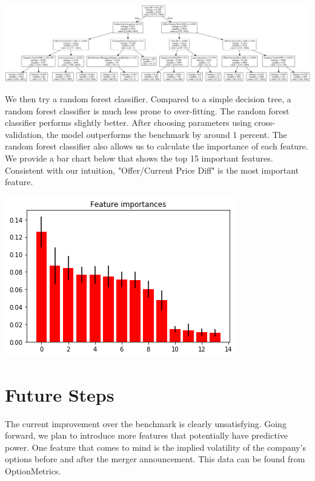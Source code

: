 \documentclass[a4paper]{article}
\begin{document}
\begin{center}
\includegraphics[scale=0.15]{tree.png} 

\end{center}

We then try a random forest classifier. Compared to a simple decision tree, a random forest classifier is much less prone to over-fitting. The random forest classifier performs slightly better. After choosing parameters using cross-validation, the model outperforms the benchmark by around 1 percent.  The random forest classifier also allows us to calculate the importance of each feature. We provide a bar chart below that shows the top 15 important features. Consistent with our intuition, "Offer/Current Price Diff" is the most important feature. 

\begin{center}
\includegraphics[scale=0.5]{Feature_Importance.png} 

\end{center}


\section{Future Steps }
\label{sec:future}

The current improvement over the benchmark is clearly unsatisfying. Going forward, we plan to introduce more features that potentially have predictive power. One feature that comes to mind is the implied volatility of the company's options before and after the merger announcement. This data can be found from OptionMetrics.
\end{document}
